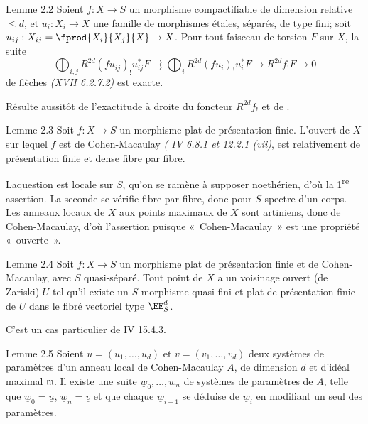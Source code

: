 \begin{enonce*}{Lemme 2.2}
Soient $f:X\rightarrow S$ un morphisme compactifiable de dimension
relative $\leq d$, et $u_{i}:X_{i}\rightarrow X$ une famille de
morphismes étales, séparés, de type fini; soit
$u_{ij}:X_{ij}=\fprod{X_{i}}{X_{j}}{X}\rightarrow X$. Pour tout
faisceau de torsion $F$ sur $X$, la suite
$$
\bigoplus_{i,j} R^{2d}(fu_{ij})_{!}u^{\ast}_{ij}F\rightrightarrows
\bigoplus_{i} R^{2d}(fu_{i})_{!}u^{\ast}_{i}F\rightarrow
R^{2d}f_{!}F\rightarrow 0
$$
de flèches \emph{(XVII 6.2.7.2)} est exacte.
\end{enonce*}

Résulte aussitôt de l'exactitude à droite du foncteur $R^{2d}f_{!}$ et
de .

\begin{enonce*}{Lemme 2.3}
Soit $f:X\rightarrow S$ un morphisme plat de présentation
finie. L'ouvert de $X$ sur lequel $f$ est de Cohen-Macaulay \emph{(\EGA
IV 6.8.1 et 12.2.1 (vii)}, est relativement de présentation finie et
dense fibre par fibre.
\end{enonce*}

La\pageoriginale question est locale sur $S$, qu'on se ramène à
supposer noethérien, d'où la 1\textsuperscript{re} assertion. La seconde se vérifie
fibre par fibre, donc pour $S$ spectre d'un corps. Les anneaux locaux
de $X$ aux points maximaux de $X$ sont artiniens, donc de
Cohen-Macaulay, d'où l'assertion puisque « Cohen-Macaulay »  est
une propriété « ouverte ».

\begin{enonce*}{Lemme 2.4}
Soit $f:X\rightarrow S$ un morphisme plat de présentation finie et de
Cohen-Macaulay, avec $S$ quasi-séparé. Tout point de $X$ a un
voisinage ouvert (de Zariski) $U$ tel qu'il existe un $S$-morphisme
quasi-fini et plat de présentation finie de $U$ dans le fibré vectoriel
type $\EE^{d}_{S}$.
\end{enonce*}

C'est un cas particulier de \EGA IV 15.4.3.

\begin{enonce*}{Lemme 2.5}
Soient $\underline{u}=(u_{1},\ldots,u_{d})$ et $\underline{v}=(v_{1},\ldots,v_{d})$
deux systèmes de paramètres d'un anneau local de Cohen-Macaulay $A$,
de dimension $d$ et d'idéal maximal $\mathfrak{m}$. Il existe une suite
$\underline{w}_{0},\ldots,w_{n}$ de systèmes de paramètres de $A$, telle que
$\underline{w}_{0}=\underline{u}$, $\underline{w}_{n}=\underline{v}$ et que
chaque $\underline{w}_{i+1}$ se
déduise de $\underline{w}_{i}$ en modifiant un seul des paramètres.
\end{enonce*}

